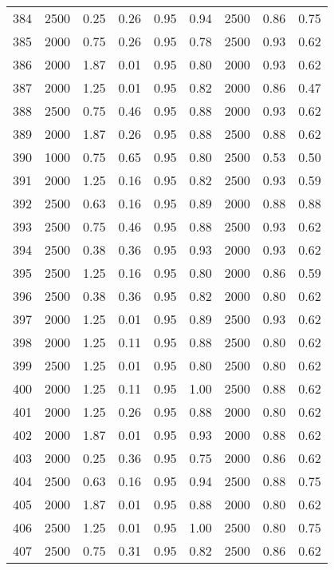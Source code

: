 \begin{longtable}[c]{ccccccccc}
384 &  2500 &  0.25 &  0.26 &  0.95 &  0.94 &  2500 &  0.86 &  0.75 \\
385 &  2000 &  0.75 &  0.26 &  0.95 &  0.78 &  2500 &  0.93 &  0.62 \\
386 &  2000 &  1.87 &  0.01 &  0.95 &  0.80 &  2000 &  0.93 &  0.62 \\
387 &  2000 &  1.25 &  0.01 &  0.95 &  0.82 &  2000 &  0.86 &  0.47 \\
388 &  2500 &  0.75 &  0.46 &  0.95 &  0.88 &  2000 &  0.93 &  0.62 \\
389 &  2000 &  1.87 &  0.26 &  0.95 &  0.88 &  2500 &  0.88 &  0.62 \\
390 &  1000 &  0.75 &  0.65 &  0.95 &  0.80 &  2500 &  0.53 &  0.50 \\
391 &  2000 &  1.25 &  0.16 &  0.95 &  0.82 &  2500 &  0.93 &  0.59 \\
392 &  2500 &  0.63 &  0.16 &  0.95 &  0.89 &  2000 &  0.88 &  0.88 \\
393 &  2500 &  0.75 &  0.46 &  0.95 &  0.88 &  2500 &  0.93 &  0.62 \\
394 &  2500 &  0.38 &  0.36 &  0.95 &  0.93 &  2000 &  0.93 &  0.62 \\
395 &  2500 &  1.25 &  0.16 &  0.95 &  0.80 &  2000 &  0.86 &  0.59 \\
396 &  2500 &  0.38 &  0.36 &  0.95 &  0.82 &  2000 &  0.80 &  0.62 \\
397 &  2000 &  1.25 &  0.01 &  0.95 &  0.89 &  2500 &  0.93 &  0.62 \\
398 &  2000 &  1.25 &  0.11 &  0.95 &  0.88 &  2500 &  0.80 &  0.62 \\
399 &  2500 &  1.25 &  0.01 &  0.95 &  0.80 &  2500 &  0.80 &  0.62 \\
400 &  2000 &  1.25 &  0.11 &  0.95 &  1.00 &  2500 &  0.88 &  0.62 \\
401 &  2000 &  1.25 &  0.26 &  0.95 &  0.88 &  2000 &  0.80 &  0.62 \\
402 &  2000 &  1.87 &  0.01 &  0.95 &  0.93 &  2000 &  0.88 &  0.62 \\
403 &  2000 &  0.25 &  0.36 &  0.95 &  0.75 &  2000 &  0.86 &  0.62 \\
404 &  2500 &  0.63 &  0.16 &  0.95 &  0.94 &  2500 &  0.88 &  0.75 \\
405 &  2000 &  1.87 &  0.01 &  0.95 &  0.88 &  2000 &  0.80 &  0.62 \\
406 &  2500 &  1.25 &  0.01 &  0.95 &  1.00 &  2500 &  0.80 &  0.75 \\
407 &  2500 &  0.75 &  0.31 &  0.95 &  0.82 &  2500 &  0.86 &  0.62 \\

\end{longtable}
